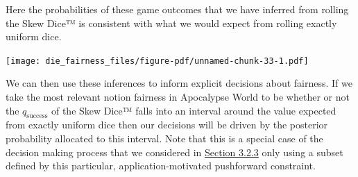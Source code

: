 \documentclass[
  letterpaper,
  DIV=11,
  numbers=noendperiod]{scrartcl}
\newenvironment{Shaded}{\begin{snugshade}}{\end{snugshade}}
\newcommand{\AttributeTok}[1]{\textcolor[rgb]{0.40,0.45,0.13}{#1}}
\newcommand{\DecValTok}[1]{\textcolor[rgb]{0.68,0.00,0.00}{#1}}
\newcommand{\FunctionTok}[1]{\textcolor[rgb]{0.28,0.35,0.67}{#1}}
\newcommand{\NormalTok}[1]{\textcolor[rgb]{0.00,0.23,0.31}{#1}}
\newcommand{\SpecialCharTok}[1]{\textcolor[rgb]{0.37,0.37,0.37}{#1}}
\newcommand{\StringTok}[1]{\textcolor[rgb]{0.13,0.47,0.30}{#1}}
\begin{document}
Here the probabilities of these game outcomes that we have inferred from
rolling the Skew Dice™ is consistent with what we would expect from
rolling exactly uniform dice.

\begin{Shaded}
\end{Shaded}

\texttt{[image: die\_fairness\_files/figure-pdf/unnamed-chunk-33-1.pdf]}

We can then use these inferences to inform explicit decisions about
fairness. If we take the most relevant notion fairness in Apocalypse
World to be whether or not the \(q_{\mathrm{success}}\) of the Skew
Dice™ falls into an interval around the value expected from exactly
uniform dice then our decisions will be driven by the posterior
probability allocated to this interval. Note that this is a special case
of the decision making process that we considered in
\hyperref[sec:decisions]{Section 3.2.3} only using a subset defined by
this particular, application-motivated pushforward constraint.
\end{document}
